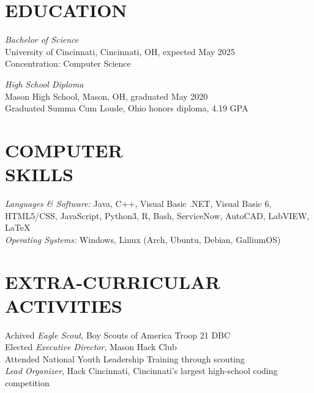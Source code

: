 \documentclass[margin, 10pt]{res} %
\begin{document}
\begin{resume}

\section{EDUCATION}

{\sl Bachelor of Science}\\
University of Cincinnati, Cincinnati, OH, expected May 2025 \\
Concentration: Computer Science

{\sl High School Diploma}\\
Mason High School, Mason, OH, graduated May 2020 \\
Graduated Summa Cum Loude, Ohio honors diploma, 4.19 GPA


\section{COMPUTER \\ SKILLS} 

{\sl Languages \& Software:} 
Java, C++, Visual Basic .NET, Visual Basic 6, HTML5/CSS, JavaScript, Python3, R, Bash, ServiceNow, AutoCAD, LabVIEW, \LaTeX{} \\
{\sl Operating Systems:} Windows, Linux (Arch, Ubuntu, Debian, GalliumOS)


\section{EXTRA-CURRICULAR \\ ACTIVITIES} 

Achived {\it Eagle Scout}, Boy Scouts of America Troop 21 DBC \\
Elected {\it Executive Director}, Mason Hack Club \\
Attended National Youth Leadership Training through scouting \\
{\it Lead Organizer}, Hack Cincinnati, Cincinnati's largest high-school coding competition


\end{resume}
\end{document}
